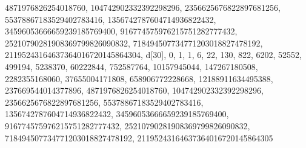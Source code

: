 {{{   4871976826254018760, 104742902332392298296, 2356625676822897681256, 
   55378867183529402783416, 1356742787604714936822432, 
   34596053666659239185769400, 916774575976215751282777432, 
   25210790281908369799826090832, 718494507734771203018827478192, 
   21195243164637364016720145864304}}, 
 {d[30], {0, 1, 1, 6, 22, 130, 822, 6202, 52552, 499194, 5238370, 60222844, 
   752587764, 10157945044, 147267180508, 2282355168060, 37655004171808, 
   658906772228668, 12188911634495388, 237669544014377896, 
   4871976826254018760, 104742902332392298296, 2356625676822897681256, 
   55378867183529402783416, 1356742787604714936822432, 
   34596053666659239185769400, 916774575976215751282777432, 
   25210790281908369799826090832, 718494507734771203018827478192, 
   21195243164637364016720145864305}}}
